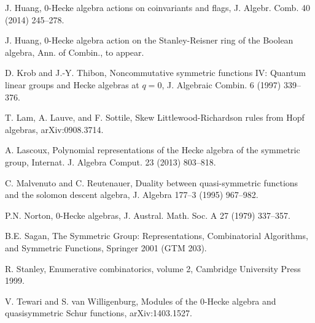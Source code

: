 \documentclass{amsart}
\newtheorem*{Young's Rule}{Young's Rule}
\theoremstyle{definition}
\theoremstyle{remark}
\numberwithin{equation}{section}
\begin{document}
\begin{thebibliography}{30}
J. Huang, 0-Hecke algebra actions on coinvariants and flags, J. Algebr. Comb. 40 (2014) 245--278.

J. Huang, 0-Hecke algebra action on the Stanley-Reisner ring of the Boolean algebra, Ann. of Combin., to appear.

D. Krob and J.-Y. Thibon, Noncommutative symmetric functions IV: Quantum linear groups and Hecke algebras at $q=0$, J. Algebraic Combin. 6 (1997) 339--376.

T. Lam, A. Lauve, and F. Sottile, Skew Littlewood-Richardson rules from Hopf algebras, arXiv:0908.3714.

A. Lascoux, Polynomial representations of the Hecke algebra of the symmetric group, Internat. J. Algebra Comput. 23 (2013) 803--818.

C. Malvenuto and C. Reutenauer, Duality between quasi-symmetric functions and the solomon descent algebra, J. Algebra 177--3 (1995) 967--982.

P.N. Norton, 0-Hecke algebras, J. Austral. Math. Soc. A 27 (1979)
337--357.

B.E. Sagan, The Symmetric Group: Representations, Combinatorial Algorithms, and Symmetric Functions,  Springer 2001 (GTM 203).

R. Stanley, Enumerative combinatorics, volume 2, Cambridge University Press 1999.

V. Tewari and S. van Willigenburg, Modules of the 0-Hecke algebra and quasisymmetric Schur functions, arXiv:1403.1527.

\end{thebibliography}
\end{document}
